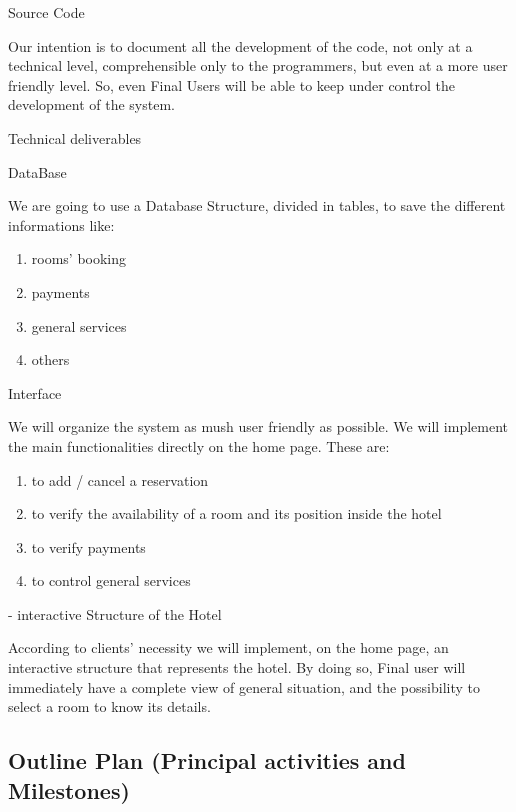 \begin{itemize}
Source Code
		
	Our intention is to document all the development of the code, not only at a technical level, comprehensible only to the programmers, but even at a more user friendly level. So, even Final Users will be able to keep under control the development of the system.

	








Technical deliverables

DataBase 
		
	We are going to use a Database Structure, divided in tables, to save the different informations like:
\begin{enumerate}
	\item rooms’ booking 
	\item payments
	\item general services 
	\item others
\end{enumerate}

Interface  
	
	We will organize the system as mush user friendly as possible. We will implement the main functionalities directly on the home page. These are:
\begin{enumerate}
	\item to add / cancel a reservation
	\item to verify the availability of a room and its position inside the hotel
	\item to verify payments
	\item to control general services
\end{enumerate}

 
	- interactive Structure of the Hotel 
	
	According to clients’ necessity we will implement, on the home page, an interactive structure that represents the hotel. By doing so, Final user will immediately have a complete view of general situation, and the possibility to select a room to know its details.





\subsection{Outline Plan (Principal activities and Milestones)}

\begin{enumerate}


\end{enumerate}
\end{itemize}
